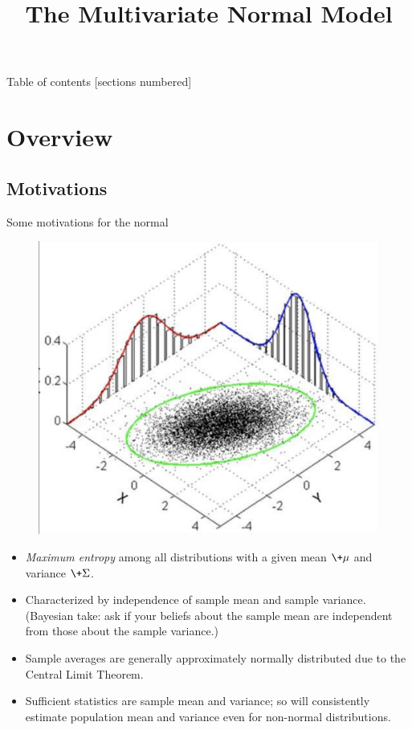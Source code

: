 \documentclass[10pt]{beamer}
\title{The Multivariate Normal Model}
\begin{document}
\maketitle

\begin{frame}{Table of contents}
  [sections numbered] \tableofcontents[hideallsubsections]
\end{frame}


\section{Overview}
\subsection{Motivations}
\begin{frame}{Some motivations for the normal}

\begin{figure}
\includegraphics[width=.3\textwidth]{images/mvn}
\end{figure}

\begin{itemize}
	\item \textit{Maximum entropy} among all distributions with a given mean $\+\mu$ and variance $\+\Sigma$.  \pause
	\item Characterized by independence of sample mean and sample variance. {\footnotesize (Bayesian take: ask if your beliefs about the sample mean are independent from those about the sample variance.)} \pause
	\item Sample averages are generally approximately normally distributed due to the Central Limit Theorem. \pause 
	\item Sufficient statistics are sample mean and variance; so will consistently estimate population mean and variance even for non-normal distributions.
\end{itemize}
\end{frame}
\end{document}
